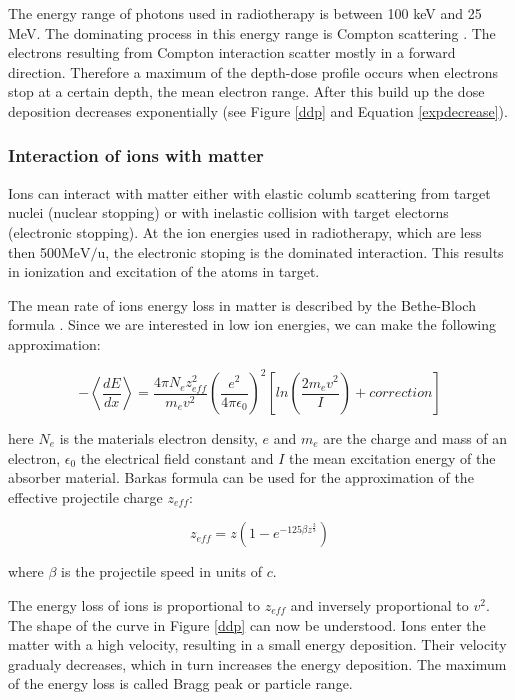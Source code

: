 \documentclass[type=dr, dr=rernat, accentcolor=tud7b,colorbacktitle, bigchapter, openright, twoside, 12pt ]{tudthesis}
\begin{document}
The energy range of photons used in radiotherapy is between 100 keV and 25 MeV. The dominating process in this energy range is Compton scattering \cite{Alpen1998}.
The electrons resulting from Compton interaction scatter mostly in a forward direction. Therefore a maximum of the depth-dose profile occurs when electrons stop at a certain depth, 
the mean electron range. After this build up the dose deposition decreases exponentially (see Figure \ref{ddp} and Equation \ref{expdecrease}).


\subsubsection{Interaction of ions with matter}
\label{iion}
Ions can interact with matter either with elastic columb scattering from target nuclei (nuclear stopping) or with inelastic collision with target electorns (electronic stopping).
At the ion energies used in radiotherapy, which are less then 500$\mathrm{MeV}/\mathrm{u}$, the electronic stoping is the dominated interaction. This results in ionization and excitation of the atoms in target.

The mean rate of ions energy loss in matter is described by the Bethe-Bloch formula \cite{Bethe1930, Bloch1933}. Since we are interested in low ion energies, we can make the following approximation:

\begin{equation}
- \left \langle \frac{dE}{dx} \right \rangle = \frac{ 4 \pi N_{e} z_{eff}^{2} }{ m_{e} v^{2} } \left( \frac{e^{2}}{4\pi \epsilon_{0}} \right) ^{2} \left[ln \left( \frac{2m_{e}v^{2}}{I} \right)+correction \right]
 \label{bethe}
\end{equation}

here $N_{e}$ is the materials electron density, $e$ and $m_{e}$ are the charge and mass 
of an electron, $\epsilon_{0}$ the electrical field constant and $I$ the mean excitation energy of the absorber material. 
Barkas formula \cite{Barkas1963} can be used for the approximation of the effective projectile charge $z_{eff}$: 

\begin{equation}
 z_{eff} = z \left( 1 - e^{-125 \beta z^{\frac{2}{3}}} \right)
\end{equation}

where $\beta$ is the projectile speed in units of $c$.

The energy loss of ions is proportional to $z_{eff}$ and inversely proportional to $v^2$. The shape of the curve in Figure \ref{ddp} can now be understood. Ions enter the matter with a high velocity,
resulting in a small energy deposition. Their velocity gradualy decreases, which in turn increases the energy deposition. The maximum of the energy loss is called Bragg peak or particle range.
\end{document}
